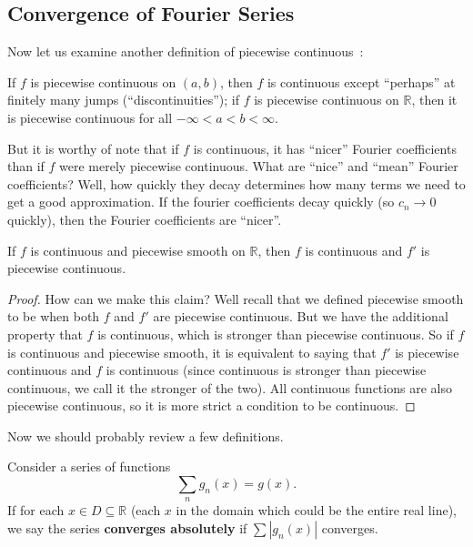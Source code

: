 \subsection{Convergence of Fourier Series}
Now let us examine another definition of piecewise
continuous~\cite{textbook}:
\begin{defn}
If $f$ is piecewise continuous on $(a,b)$, then $f$ is
continuous except ``perhaps'' at finitely many jumps
(``discontinuities''); if $f$ is piecewise continuous on
$\mathbb{R}$, then it is piecewise continuous for all
$-\infty<a<b<\infty$.
\end{defn}
But it is worthy of note that if $f$ is continuous, it has
``nicer'' Fourier coefficients than if $f$ were merely
piecewise continuous. What are ``nice'' and ``mean'' Fourier
coefficients? Well, how quickly they decay determines how
many terms we need to get a good approximation. If the
fourier coefficients decay quickly (so $c_{n}\to 0$
quickly), then the Fourier coefficients are ``nicer''.

\begin{prop}
If $f$ is continuous and piecewise smooth on $\mathbb{R}$,
then $f$ is continuous and $f'$ is piecewise continuous.
\end{prop}
\begin{proof}
How can we make this claim? Well recall that we defined
piecewise smooth to be when both $f$ and $f'$ are piecewise
continuous. But we have the additional property that $f$ is
continuous, which is stronger than piecewise continuous. So
if $f$ is continuous and piecewise smooth, it is equivalent
to saying that $f'$ is piecewise continuous and $f$ is
continuous (since continuous is stronger than piecewise
continuous, we call it the stronger of the two). All
continuous functions are also piecewise continuous, so it is
more strict a condition to be continuous.
\end{proof}

Now we should probably review a few definitions.

\begin{defn}
Consider a series of functions
\begin{equation*}
\sum_{n}g_{n}(x) = g(x).
\end{equation*}
If for each $x\in D\subseteq\mathbb{R}$ (each $x$ in the
domain which could be the entire real line), we say the
series \textbf{converges absolutely} if
$\sum|g_{n}(x)|$ converges.
\end{defn}


